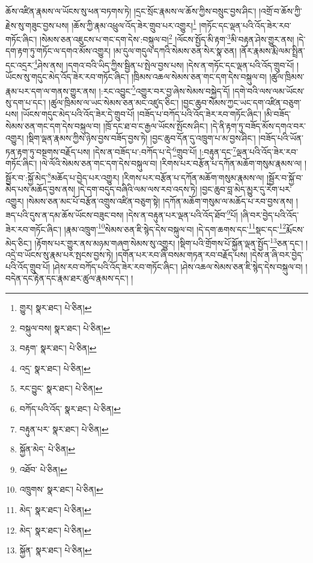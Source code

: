 ཆོས་འཛིན་རྣམས་ལ་ཡོངས་སུ་ཕན་བཏགས་ཏེ། །དྲང་སྲོང་རྣམས་ལ་ཆོས་ཀྱིས་བསྲུང་བྱས་ཤིང་། །འགྲོ་བ་ཆོས་ཀྱི་རྗེས་སུ་གཟུང་བྱས་པས། །ཆོས་ཀྱི་རྣམ་འཕྲུལ་འོད་ཟེར་གྲུབ་པར་འགྱུར།\footnote{གྱུར།  སྣར་ཐང་།  པེ་ཅིན། } །གཏོང་དང་ལྡན་པའི་འོད་ཟེར་རབ་གཏོང་ཞིང་། །སེམས་ཅན་འཇུངས་པ་གང་དག་དེས་:བསྐུལ་བ།\footnote{བསྐུལ་བས།  སྣར་ཐང་།  པེ་ཅིན། } །ལོངས་སྤྱོད་མི་རྟག་\footnote{བརྟག་  སྣར་ཐང་།  པེ་ཅིན། }མི་བརྟན་ཤེས་གྱུར་ནས། །དེ་དག་རྟག་ཏུ་གཏོང་ལ་དགའ་མོས་འགྱུར། །མ་དུལ་གདུལ་དཀའི་སེམས་ཅན་སེར་སྣ་ཅན། །ནོར་རྣམས་རྨི་ལམ་སྤྲིན་དང་འདྲར་\footnote{འདྲ་  སྣར་ཐང་།  པེ་ཅིན། }ཤེས་ནས། །དགའ་བའི་ཡིད་ཀྱིས་སྦྱིན་པ་སྤེལ་བྱས་པས། །དེས་ན་གཏོང་དང་ལྡན་པའི་འོད་གྲུབ་པོ། །ཡོངས་སུ་གདུང་མེད་འོད་ཟེར་རབ་གཏོང་ཞིང་། །ཁྲིམས་འཆལ་སེམས་ཅན་གང་དག་དེས་བསྐུལ་བ། །ཚུལ་ཁྲིམས་རྣམ་པར་དག་ལ་གནས་གྱུར་ནས། །:རང་འབྱུང་\footnote{རང་བྱུང་  སྣར་ཐང་།  པེ་ཅིན། }འགྱུར་བར་བྱ་ཞེས་སེམས་བསྐྱེད་དོ། །དགེ་བའི་ལས་ལམ་ཡོངས་སུ་དག་པ་དང་། །ཚུལ་ཁྲིམས་ལ་ཡང་སེམས་ཅན་མང་འཛུད་ཅིང་། །བྱང་ཆུབ་སེམས་ཀྱང་ཡང་དག་འཛིན་བཅུག་པས། །ཡོངས་གདུང་མེད་པའི་འོད་ཟེར་དེ་གྲུབ་པོ། །བཟོད་པ་བཀོད་པའི་འོད་ཟེར་རབ་གཏོང་ཞིང་། །མི་བཟོད་སེམས་ཅན་གང་དག་དེས་བསྐུལ་བ། །ཁྲོ་དང་ཐ་བ་ང་རྒྱལ་ཡོངས་སྤོངས་ཤིང་། །དེ་ནི་རྟག་ཏུ་བཟོད་མོས་དགའ་བར་འགྱུར། །སྡིག་ལྡན་རྣམས་ཀྱིས་ཉེས་བྱས་བཟོད་བྱས་ཏེ། །བྱང་ཆུབ་དོན་དུ་འཁྲུག་པ་མ་བྱས་ཤིང་། །བཟོད་པའི་ཡོན་ཏན་རྟག་ཏུ་བསྔགས་བརྗོད་པས། །དེས་ན་བཟོད་པ་:བཀོད་པ་དེ་\footnote{བཀོད་པའི་འོད་  སྣར་ཐང་།  པེ་ཅིན། }གྲུབ་པོ། །:བརྟུན་དང་\footnote{བརྟུན་པར་  སྣར་ཐང་།  པེ་ཅིན། }ལྡན་པའི་འོད་ཟེར་རབ་གཏོང་ཞིང་། །ལེ་ལོའི་སེམས་ཅན་གང་དག་དེས་བསྐུལ་བ། །རིགས་པར་བརྩོན་པ་དཀོན་མཆོག་གསུམ་རྣམས་ལ། །སྦྱོར་བ་:སྐྱོ་མེད་\footnote{སྐྱོན་མེད་  པེ་ཅིན། }མཆོད་པ་བྱེད་པར་འགྱུར། །རིགས་པར་བརྩོན་པ་དཀོན་མཆོག་གསུམ་རྣམས་ལ། །སྦྱོར་བ་སྐྱོ་བ་མེད་པས་མཆོད་བྱས་ནས། །དེ་དག་བདུད་བཞིའི་ལམ་ལས་རབ་འདས་ཏེ། །བྱང་ཆུབ་བླ་མེད་མྱུར་དུ་རེག་པར་འགྱུར། །སེམས་ཅན་མང་པོ་བརྩོན་འགྲུས་འཛིན་བཅུག་སྟེ། །དཀོན་མཆོག་གསུམ་ལ་མཆོད་པ་རབ་བྱས་ནས། །ཟད་པའི་དུས་ན་དམ་ཆོས་ཡོངས་བཟུང་བས། །དེས་ན་བརྟུན་པར་ལྡན་པའི་འོད་ཐོབ་\footnote{འཐོབ་  པེ་ཅིན། }པོ། །ཞི་བར་བྱེད་པའི་འོད་ཟེར་རབ་གཏོང་ཞིང་། །རྣམ་འཁྲུག་\footnote{འཁྲུགས་  སྣར་ཐང་།  པེ་ཅིན། }སེམས་ཅན་ཇི་སྙེད་དེས་བསྐུལ་བ། །དེ་དག་ཆགས་དང་\footnote{མེད་  སྣར་ཐང་།  པེ་ཅིན། }སྡང་དང་\footnote{མེད་  སྣར་ཐང་།  པེ་ཅིན། }རྨོངས་མེད་ཅིང་། །རྟོགས་པར་གྱུར་ནས་མཉམ་གཞག་སེམས་སུ་འགྱུར། །སྡིག་པའི་གྲོགས་པོ་སྐྱོན་ལྡན་སྤྱོད་\footnote{སྐྱོན་  སྣར་ཐང་།  པེ་ཅིན། }ཅན་དང་། །འདྲེ་བ་ཡོངས་སུ་རྣམ་པར་སྤངས་བྱས་ཏེ། །དགོན་པར་རབ་ཞི་བསམ་གཏན་རབ་བརྗོད་པས། །དེས་ན་ཞི་བར་བྱེད་པའི་འོད་གྲུབ་པོ། །ཤེས་རབ་བཀོད་པའི་འོད་ཟེར་རབ་གཏོང་ཞིང་། །ཤེས་འཆལ་སེམས་ཅན་ཇི་སྙེད་དེས་བསྐུལ་བ། །བདེན་དང་རྟེན་དང་རྣམ་ཐར་ཚུལ་རྣམས་དང་། །
